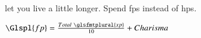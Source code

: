 \subsubsection{}
let you live a little longer.
Spend \glspl{fp} instead of \glspl{hp}.

\begin{center}
$\Glspl{fp} = \frac{Total~\glsfmtplural{xp}}{10} + Charisma$
\end{center}
